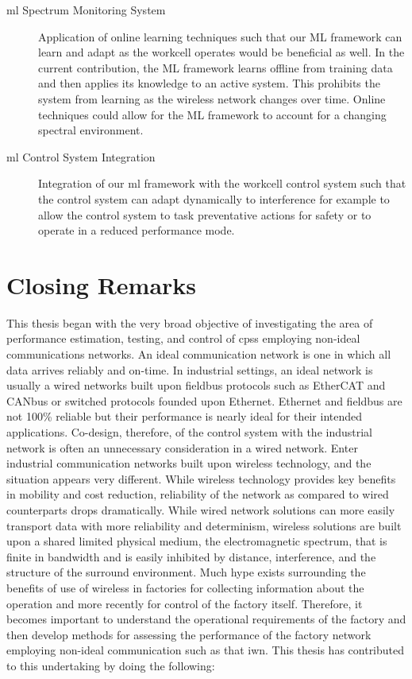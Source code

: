 \begin{description}
	\item[\Gls{ml} Spectrum Monitoring System] Application of online learning techniques such that our ML framework can learn and adapt as the workcell operates would be beneficial as well.  In the current contribution, the ML framework learns offline from training data and then applies its knowledge to an active system.  This prohibits the system from learning as the wireless network changes over time.  Online techniques could allow for the ML framework to account for a changing spectral environment.
	
	\item[\Gls{ml} Control System Integration] Integration of our \gls{ml} framework with the workcell control system such that the control system can adapt dynamically to interference for example to allow the control system to task preventative actions for safety or to operate in a reduced performance mode.
	
\end{description}

\section{Closing Remarks}

This thesis began with the very broad objective of investigating the area of performance estimation, testing, and control of \glspl{cps} employing non-ideal communications networks.  An ideal communication network is one in which all data arrives reliably and on-time.  In industrial settings, an ideal network is usually a wired networks built upon fieldbus protocols such as EtherCAT and CANbus or switched protocols founded upon Ethernet.  Ethernet and fieldbus are not 100\% reliable but their performance is nearly ideal for their intended applications.  Co-design, therefore, of the control system with the industrial network is often an unnecessary consideration in a wired network.  Enter industrial communication networks built upon wireless technology, and the situation appears very different.  While wireless technology provides key benefits in mobility and cost reduction, reliability of the network as compared to wired counterparts drops dramatically.  While wired network solutions can more easily transport data with more reliability and determinism, wireless solutions are built upon a shared limited physical medium, the electromagnetic spectrum, that is finite in bandwidth and is easily inhibited by distance, interference, and the structure of the surround environment.  Much hype exists surrounding the benefits of use of wireless in factories for collecting information about the operation and more recently for control of the factory itself.  Therefore, it becomes important to understand the operational requirements of the factory and then develop methods for assessing the performance of the factory network employing non-ideal communication such as that \gls{iwn}.  This thesis has contributed to this undertaking by doing the following:


